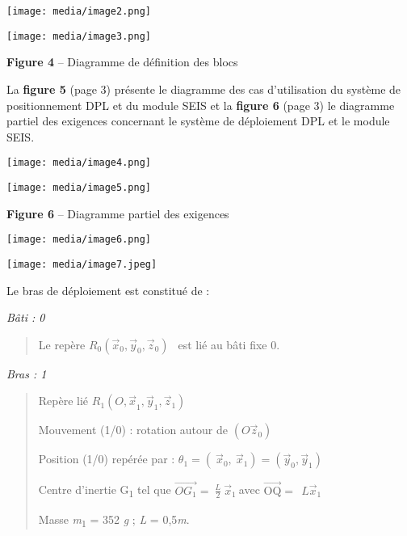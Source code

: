 \documentclass[]{article}
\begin{document}
\texttt{[image: media/image2.png]}

\texttt{[image: media/image3.png]}

\textbf{Figure 4} -- Diagramme de définition des blocs

La \textbf{figure 5} (page 3) présente le diagramme des cas
d'utilisation du système de positionnement DPL et du module SEIS et la
\textbf{figure 6} (page 3) le diagramme partiel des exigences concernant
le système de déploiement DPL et le module SEIS.\textbf{\\
}

\texttt{[image: media/image4.png]}

\texttt{[image: media/image5.png]}

\textbf{Figure 6} -- Diagramme partiel des exigences

\protect\hypertarget{page5}{}{}\texttt{[image: media/image6.png]}

\texttt{[image: media/image7.jpeg]}

Le bras de déploiement est constitué de :

\emph{Bâti : 0}

\begin{quote}
Le repère
\(R_{0}({\overrightarrow{x}}_{0},{\overrightarrow{y}}_{0},{\overrightarrow{z}}_{0})\ \ \)
est lié au bâti fixe 0.
\end{quote}

\emph{Bras : 1}

\begin{quote}
Repère lié
\(R_{1}({O,\overrightarrow{x}}_{1},{\overrightarrow{y}}_{1},{\overrightarrow{z}}_{1})\ \ \)

Mouvement (1/0) : rotation autour de
\(\left( O{\overrightarrow{z}}_{0} \right)\)

Position (1/0) repérée par :
\(\theta_{1} = (\ {\overrightarrow{x}}_{0},\ {\overrightarrow{x}}_{1}) = ({\overrightarrow{y}}_{0},{\overrightarrow{y}}_{1})\)

Centre d'inertie G\textsubscript{1} tel que
\(\overrightarrow{OG_{1}} = \ \frac{L}{2}\ {\overrightarrow{x}}_{1}\ \)avec
\(\overrightarrow{\text{OQ}} = \ \ {L\overrightarrow{x}}_{1}\)

Masse \emph{m}\textsubscript{1} = 352 \emph{g} ; \emph{L} = 0,5\emph{m}.
\end{quote}
\end{document}
